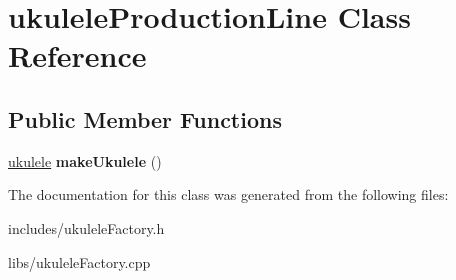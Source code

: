 \hypertarget{classukulele_production_line}{}\section{ukulele\+Production\+Line Class Reference}
\label{classukulele_production_line}
\subsection*{Public Member Functions}
\begin{DoxyCompactItemize}
\item 
\hypertarget{classukulele_production_line_abfe0a88ab50eff266b2598c967ca74e4}{}\label{classukulele_production_line_abfe0a88ab50eff266b2598c967ca74e4} 
\hyperlink{classukulele}{ukulele} {\bfseries make\+Ukulele} ()
\end{DoxyCompactItemize}


The documentation for this class was generated from the following files\+:\begin{DoxyCompactItemize}
\item 
includes/ukulele\+Factory.\+h\item 
libs/ukulele\+Factory.\+cpp\end{DoxyCompactItemize}

